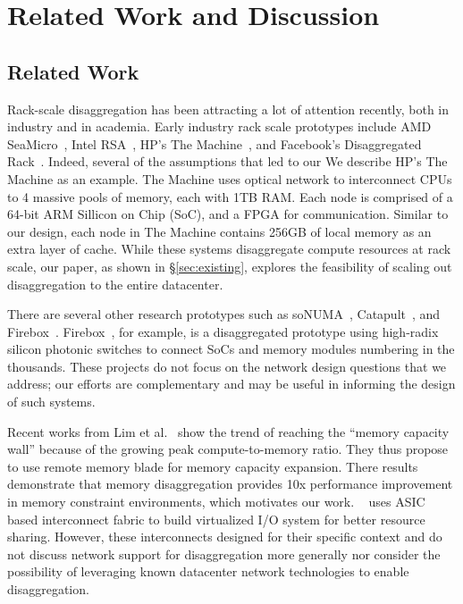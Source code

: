 \section{Related Work and Discussion}
\label{sec:discussion}

\subsection{Related Work}
 Rack-scale disaggregation has been attracting a lot of attention recently, both in industry and in academia. Early industry rack scale prototypes include AMD SeaMicro~\cite{seamicro}, Intel RSA~\cite{rsa}, HP's The Machine~\cite{hptm}, and Facebook's Disaggregated Rack~\cite{fdr}. Indeed, several of the assumptions that led to our  We describe HP's The Machine as an example. 
The Machine uses optical network to interconnect CPUs to 4 massive pools of memory, each with 1TB RAM.
Each node is comprised of a 64-bit ARM Sillicon on Chip (SoC), and a FPGA for communication. 
Similar to our design, each node in The Machine contains 256GB of local memory as an extra layer of cache.
While these systems disaggregate compute resources at rack scale, our paper, as shown in \S \ref{sec:existing}, explores the feasibility of scaling out disaggregation to the entire datacenter.


There are several other research prototypes such as soNUMA~\cite{sonuma}, Catapult~\cite{catapult}, and Firebox~\cite{firebox}.
Firebox~\cite{firebox}, for example, is a disaggregated prototype using high-radix silicon photonic switches to connect SoCs and memory modules numbering in the thousands.
These projects do not focus on the network design questions that we address; our efforts are complementary and may be useful in informing the design of such systems.


Recent works from Lim et al.~\cite{ddcHwDesign1, ddcHwDesign2} show the trend of reaching the ``memory capacity wall'' because of the growing peak compute-to-memory ratio. 
They thus propose to use remote memory blade for memory capacity expansion. 
There results demonstrate that memory disaggregation provides 10x performance improvement in memory constraint environments, which motivates our work.
~\cite{ddcHwDesign3} uses ASIC based interconnect fabric to build virtualized I/O system for better resource sharing. 
However, these interconnects designed for their specific context and do not discuss network support for disaggregation more generally nor consider the possibility of leveraging known datacenter network technologies to enable disaggregation.


